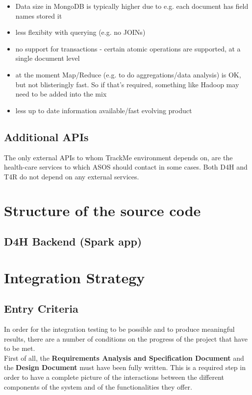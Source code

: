 \documentclass[a4paper, hidelinks, 12pt]{report}
\begin{document}
\begin{itemize}
\item{} Data size in MongoDB is typically higher due to e.g. each document has field names stored it
\item{} less flexibity with querying (e.g. no JOINs)
\item{} no support for transactions - certain atomic operations are supported, at a single document level
\item{} at the moment Map/Reduce (e.g. to do aggregations/data analysis) is OK, but not blisteringly fast. So if that's required, something like Hadoop may need to be added into the mix
\item{} less up to date information available/fast evolving product

\end{itemize}







	\section{Additional APIs}
The only external APIs to whom TrackMe environment depends on, are the health-care services to which ASOS should contact in some cases. Both D4H and T4R do not depend on any external services.


\chapter{Structure of the source code}

\section{D4H Backend (Spark app)}


	\chapter{Integration Strategy}
	\section{Entry Criteria}
	\label{sec:Entry Criteria}
	In order for the integration testing to be possible and to produce meaningful results, there are a number of conditions on the progress of the project that have to be met.\\
	\quad First of all, the \textbf{Requirements Analysis and Specification Document} and the \textbf{Design Document} must have been fully written. This is a required step in order to have a complete picture of the interactions between the different components of the system and of the functionalities they offer.\\
	
\end{document}
